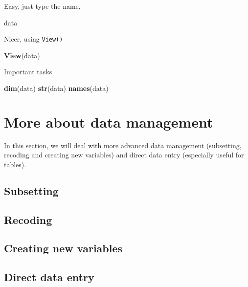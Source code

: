 \documentclass[]{book}
\newenvironment{Shaded}{\begin{snugshade}}{\end{snugshade}}
\newcommand{\KeywordTok}[1]{\textcolor[rgb]{0.13,0.29,0.53}{\textbf{{#1}}}}
\newcommand{\NormalTok}[1]{{#1}}
\theoremstyle{definition}
\theoremstyle{definition}
\theoremstyle{remark}
\begin{document}
Easy, just type the name,

\begin{Shaded}
\begin{Highlighting}[]
\NormalTok{data}
\end{Highlighting}
\end{Shaded}

Nicer, using \texttt{View()}

\begin{Shaded}
\begin{Highlighting}[]
\KeywordTok{View}\NormalTok{(data)}
\end{Highlighting}
\end{Shaded}

Important tasks

\begin{Shaded}
\begin{Highlighting}[]
\KeywordTok{dim}\NormalTok{(data)}
\KeywordTok{str}\NormalTok{(data)}
\KeywordTok{names}\NormalTok{(data)}
\end{Highlighting}
\end{Shaded}

\section{More about data management}\label{more-about-data-management}

In this section, we will deal with more advanced data management
(subsetting, recoding and creating new variables) and direct data entry
(especially useful for tables).

\subsection{Subsetting}\label{subsetting}

\subsection{Recoding}\label{recoding}

\subsection{Creating new variables}\label{creating-new-variables}

\subsection{Direct data entry}\label{direct-data-entry}
\end{document}
